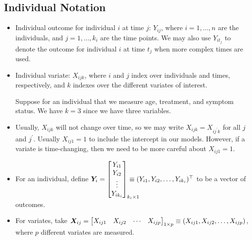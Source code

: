\subsection*{Individual Notation}
\begin{itemize}
      \item Individual outcome for individual
            $ i $ at time $ j $: $ Y_{ij} $, where $ i=1,\ldots,n $
            are the individuals, and $ j=1,\ldots,k_i $ are the time points.
            We may also use $ Y_{it_j} $ to denote the outcome
            for individual $ i $ at time $ t_j $ when more complex times are used.
      \item Individual variate: $ X_{ijk} $, where $ i $ and $ j $
            index over individuals and times, respectively, and $ k $ indexes over the
            different variates of interest.
            \begin{Example}{}
                  Suppose for an individual that
                  we measure age, treatment, and symptom status.
                  We have $ k=3 $ since we have three variables.
            \end{Example}
      \item Usually, $ X_{ijk} $ will not change over time,
            so we may write $ X_{ijk}=X_{ij^\prime k} $ for all $ j $
            and $ j^\prime $. Usually $ X_{ij1}=1 $ to include the intercept
            in our models. However, if a variate is time-changing, then
            we need to be more careful about $ X_{ij1}=1 $.
      \item For an individual, define
            $\Matrix{Y}_i=\begin{bmatrix}
                        Y_{i1} \\
                        Y_{i2} \\
                        \vdots \\
                        Y_{ik_i}
                  \end{bmatrix}_{\mathrlap{k_i\times 1}}\equiv
                  (Y_{i1},Y_{i2},\ldots,Y_{ik_i})^\top$
            to be a vector of outcomes.
      \item For variates, take $ \bm{X}_{ij}=\begin{bmatrix}
                        X_{ij1} &
                        X_{ij2} &
                        \cdots  &
                        X_{ijp}
                  \end{bmatrix}_{1\times p}\equiv(X_{ij1},X_{ij2},\ldots,X_{ijp}) $,
            where $ p $ different variates are measured.

\end{itemize}
